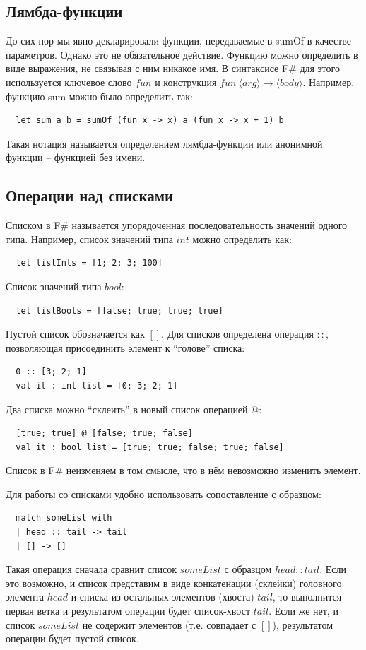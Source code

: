 \documentclass[a4paper,11pt]{article}
\begin{document}
\subsection*{Лямбда-функции}
До сих пор мы явно декларировали функции, передаваемые в sumOf в качестве
параметров. Однако это не обязательное действие. Функцию можно определить в
виде выражения, не связывая с ним никакое имя. В синтаксисе F\# для этого 
используется ключевое слово $fun$ и конструкция $fun~\langle arg
\rangle \rightarrow \langle body \rangle$. Например, функцию sum можно было
определить так:
\begin{lstlisting}
  let sum a b = sumOf (fun x -> x) a (fun x -> x + 1) b
\end{lstlisting}

Такая нотация называется определением лямбда-функции или анонимной функции --
функцией без имени.
\subsection*{Операции над списками}
Списком в F\# называется упорядоченная последовательность значений одного типа.
Например, список значений типа $int$ можно определить как:
\begin{lstlisting}
  let listInts = [1; 2; 3; 100]
\end{lstlisting}
Список значений типа $bool$:
\begin{lstlisting}
  let listBools = [false; true; true; true]
\end{lstlisting}
Пустой список обозначается как $[]$. Для списков определена операция $::$,
позволяющая присоединить элемент к ``голове'' списка:
\begin{lstlisting}
  0 :: [3; 2; 1]
  val it : int list = [0; 3; 2; 1]
\end{lstlisting}
Два списка можно ``склеить'' в новый список операцией $@$:
\begin{lstlisting}
  [true; true] @ [false; true; false]
  val it : bool list = [true; true; false; true; false]
\end{lstlisting}
Список в F\# неизменяем в том смысле, что в нём невозможно изменить элемент.

Для работы со списками удобно использовать сопоставление с образцом:
\begin{lstlisting}
  match someList with
  | head :: tail -> tail
  | [] -> []
\end{lstlisting}

Такая операция сначала сравнит список $someList$ с образцом $head :: tail$. 
Если это возможно, и список представим в виде конкатенации (склейки) головного 
элемента $head$ и списка из остальных элементов (хвоста) $tail$, то выполнится
первая ветка и результатом операции будет список-хвост $tail$. Если же нет, и
список $someList$ не содержит элементов (т.е. совпадает с $[]$), результатом
операции будет пустой список.
\end{document}
